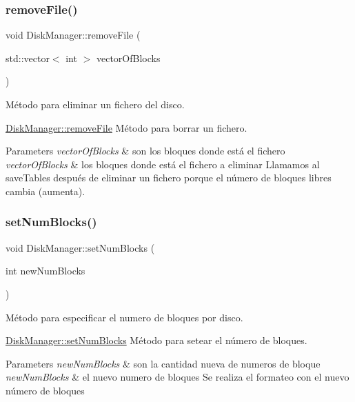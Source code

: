 \subsubsection{\texorpdfstring{remove\+File()}{removeFile()}}
{\footnotesize\ttfamily void Disk\+Manager\+::remove\+File (\begin{DoxyParamCaption}\item[{std\+::vector$<$ int $>$}]{vector\+Of\+Blocks }\end{DoxyParamCaption})}



Método para eliminar un fichero del disco. 

\hyperlink{classDiskManager_a8992533f7c0308c716c26672e5f315a2}{Disk\+Manager\+::remove\+File} Método para borrar un fichero.


\begin{DoxyParams}{Parameters}
{\em vector\+Of\+Blocks} & son los bloques donde está el fichero\\
\hline
{\em vector\+Of\+Blocks} & los bloques donde está el fichero a eliminar Llamamos al save\+Tables después de eliminar un fichero porque el número de bloques libres cambia (aumenta). \\
\hline
\end{DoxyParams}
\mbox{\label{classDiskManager_a49f4db7b478571d82860bcfe1d63fa6a}} 
\subsubsection{\texorpdfstring{set\+Num\+Blocks()}{setNumBlocks()}}
{\footnotesize\ttfamily void Disk\+Manager\+::set\+Num\+Blocks (\begin{DoxyParamCaption}\item[{int}]{new\+Num\+Blocks }\end{DoxyParamCaption})}



Método para especificar el numero de bloques por disco. 

\hyperlink{classDiskManager_a49f4db7b478571d82860bcfe1d63fa6a}{Disk\+Manager\+::set\+Num\+Blocks} Método para setear el número de bloques.


\begin{DoxyParams}{Parameters}
{\em new\+Num\+Blocks} & son la cantidad nueva de numeros de bloque\\
\hline
{\em new\+Num\+Blocks} & el nuevo numero de bloques Se realiza el formateo con el nuevo número de bloques \\
\hline
\end{DoxyParams}
\mbox{\label{classDiskManager_a864cc38c2a8b2beb355bec5bf55b8658}} 
